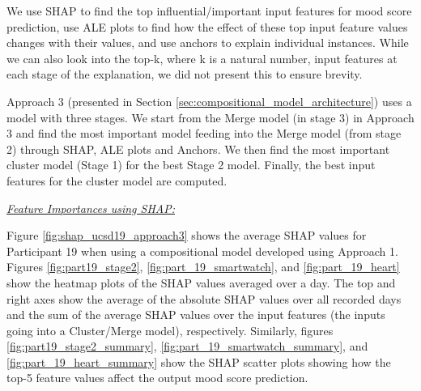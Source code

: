 We use SHAP to find the top influential/important input features for mood score prediction, use ALE plots to find how the effect of these top input feature values changes with their values, and use anchors to explain individual instances. While we can also look into the top-k, where k is a natural number, input features at each stage of the explanation, we did not present this to ensure brevity.


Approach 3 (presented in Section \ref{sec:compositional_model_architecture}) uses a model with three stages. We start from the Merge model (in stage 3) in Approach 3 and find the most important model feeding into the Merge model (from stage 2) through SHAP, ALE plots and Anchors. We then find the most important cluster model (Stage 1) for the best Stage 2 model. Finally, the best input features for the cluster model are computed. \newline


\underline{\textit{Feature Importances using SHAP:}} 

Figure \ref{fig:shap_ucsd19_approach3} shows the average SHAP values for Participant 19 when using a compositional model developed using Approach 1. Figures \ref{fig:part19_stage2}, \ref{fig:part_19_smartwatch}, and \ref{fig:part_19_heart} show the heatmap plots of the SHAP values averaged over a day.  The top and right axes show the average of the absolute SHAP values over all recorded days and the sum of the average SHAP values over the input features (the inputs going into a Cluster/Merge model), respectively. Similarly, figures  \ref{fig:part19_stage2_summary}, \ref{fig:part_19_smartwatch_summary}, and \ref{fig:part_19_heart_summary} show the SHAP scatter plots showing how the top-5 feature values affect the output mood score prediction.

